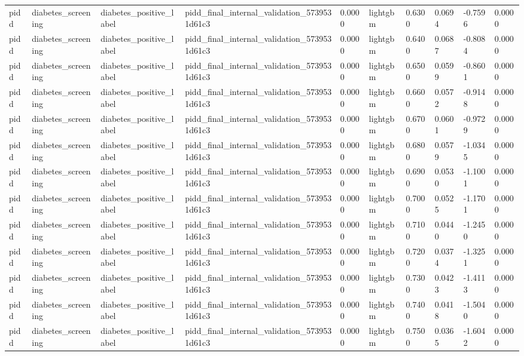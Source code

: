 \begin{tabular}{llllllllll}
pidd & diabetes\_screening & diabetes\_positive\_label & pidd\_final\_internal\_validation\_5739531d61c3 & 0.0000 & lightgbm & 0.6300 & 0.0694 & -0.7596 & 0.0000 \\
pidd & diabetes\_screening & diabetes\_positive\_label & pidd\_final\_internal\_validation\_5739531d61c3 & 0.0000 & lightgbm & 0.6400 & 0.0687 & -0.8084 & 0.0000 \\
pidd & diabetes\_screening & diabetes\_positive\_label & pidd\_final\_internal\_validation\_5739531d61c3 & 0.0000 & lightgbm & 0.6500 & 0.0599 & -0.8601 & 0.0000 \\
pidd & diabetes\_screening & diabetes\_positive\_label & pidd\_final\_internal\_validation\_5739531d61c3 & 0.0000 & lightgbm & 0.6600 & 0.0572 & -0.9148 & 0.0000 \\
pidd & diabetes\_screening & diabetes\_positive\_label & pidd\_final\_internal\_validation\_5739531d61c3 & 0.0000 & lightgbm & 0.6700 & 0.0601 & -0.9729 & 0.0000 \\
pidd & diabetes\_screening & diabetes\_positive\_label & pidd\_final\_internal\_validation\_5739531d61c3 & 0.0000 & lightgbm & 0.6800 & 0.0579 & -1.0345 & 0.0000 \\
pidd & diabetes\_screening & diabetes\_positive\_label & pidd\_final\_internal\_validation\_5739531d61c3 & 0.0000 & lightgbm & 0.6900 & 0.0530 & -1.1001 & 0.0000 \\
pidd & diabetes\_screening & diabetes\_positive\_label & pidd\_final\_internal\_validation\_5739531d61c3 & 0.0000 & lightgbm & 0.7000 & 0.0525 & -1.1701 & 0.0000 \\
pidd & diabetes\_screening & diabetes\_positive\_label & pidd\_final\_internal\_validation\_5739531d61c3 & 0.0000 & lightgbm & 0.7100 & 0.0440 & -1.2450 & 0.0000 \\
pidd & diabetes\_screening & diabetes\_positive\_label & pidd\_final\_internal\_validation\_5739531d61c3 & 0.0000 & lightgbm & 0.7200 & 0.0374 & -1.3251 & 0.0000 \\
pidd & diabetes\_screening & diabetes\_positive\_label & pidd\_final\_internal\_validation\_5739531d61c3 & 0.0000 & lightgbm & 0.7300 & 0.0423 & -1.4113 & 0.0000 \\
pidd & diabetes\_screening & diabetes\_positive\_label & pidd\_final\_internal\_validation\_5739531d61c3 & 0.0000 & lightgbm & 0.7400 & 0.0418 & -1.5040 & 0.0000 \\
pidd & diabetes\_screening & diabetes\_positive\_label & pidd\_final\_internal\_validation\_5739531d61c3 & 0.0000 & lightgbm & 0.7500 & 0.0365 & -1.6042 & 0.0000 \\

\end{tabular}
